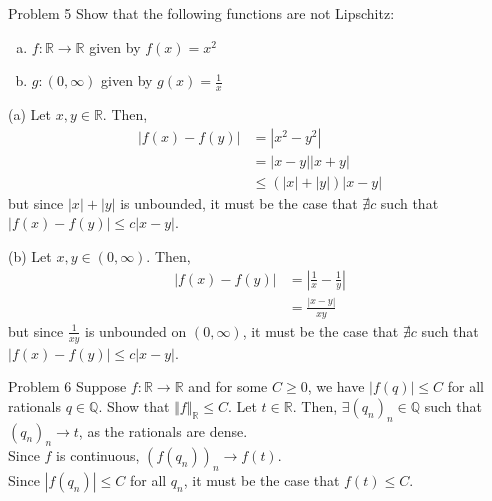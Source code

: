 \documentclass[10pt]{extarticle}
\newcommand{\Q}{\mathbb{Q}}
\newcommand{\R}{\mathbb{R}}
\begin{document}
  \begin{problem}{Problem 5}
    Show that the following functions are not Lipschitz:
    \begin{enumerate}[(a)]
      \item $f: \R \rightarrow \R$ given by $f(x) = x^2$
      \item $g: (0,\infty)$ given by $g(x) = \frac{1}{x}$
    \end{enumerate}
    \tcblower
    \begin{problem}{(a)}
      Let $x,y\in \R$. Then,
      \begin{align*}
        \left|f(x) - f(y)\right| &= \left|x^2 - y^2\right|\\
                                 &= |x-y||x+y|\\
                                 &\leq \left(|x| + |y|\right)|x-y|
      \end{align*}
      but since $|x| + |y|$ is unbounded, it must be the case that $\nexists c$ such that $|f(x) - f(y)| \leq c|x-y|$.
    \end{problem}
    \begin{problem}{(b)}
      Let $x,y\in (0,\infty)$. Then,
      \begin{align*}
        |f(x) - f(y)| &= \left|\frac{1}{x} - \frac{1}{y}\right|\\
                      &= \frac{|x-y|}{xy}
      \end{align*}
      but since $\frac{1}{xy}$ is unbounded on $(0,\infty)$, it must be the case that $\nexists c$ such that $|f(x) - f(y)| \leq c|x-y|$.
    \end{problem}
  \end{problem}
  \begin{problem}{Problem 6}
    Suppose $f: \R \rightarrow \R$ and for some $C \geq 0$, we have $|f(q)| \leq C$ for all rationals $q\in \Q$. Show that $\Vert f \Vert_{\R} \leq C$.
    \tcblower
    Let $t\in \R$. Then, $\exists (q_n)_n \in \Q$ such that $(q_n)_n \rightarrow t$, as the rationals are dense.\\

    Since $f$ is continuous, $\left(f(q_n)\right)_n \rightarrow f(t)$.\\

    Since $|f(q_n)| \leq C$ for all $q_n$, it must be the case that $f(t) \leq C$.
  \end{problem}
\end{document}
